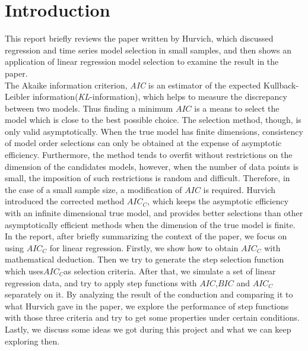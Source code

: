 \section{Introduction}
This report briefly reviews the paper written by Hurvich\cite{hurvich1989regression}, which discussed regression and time series model selection in small samples, and then shows an application of linear regression model selection to examine the result in the paper.\\

The Akaike information criterion, \emph{AIC}\cite{akaike1998information} is an estimator of the expected Kullback-Leibler information(\textit{KL}-information), which helps to measure the discrepancy between two models. Thus finding a minimum  $AIC$ is a means to select the model which is close to the best possible choice.
The selection method, though, is only valid asymptotically. When the true model has finite dimensions, consistency of model order selections can only be obtained at the expense of asymptotic efficiency\cite{hannan1979determination}. Furthermore, the method tends to overfit without restrictions on the dimension of the candidates models, however, when the number of data points is small, the imposition of such restrictions is random and difficult. 
Therefore, in the case of a small sample size, a modification of $AIC$ is required. Hurvich introduced the corrected method $AIC_C$, which keeps the asymptotic efficiency with an infinite dimensional true model, and provides better selections than other asymptotically efficient methods when the dimension of the true model is finite. \\

In the report, after briefly summarizing the context of the paper, we focus on using $AIC_C$ for linear regression. Firstly, we show how to obtain $AIC_C$ with mathematical deduction. Then we try to generate the step selection function which uses$ AIC_C $as selection criteria. After that, we simulate a set of linear regression data, and try to apply step functions with $AIC$,$ BIC$ and $AIC_C$ separately on it.  By analyzing the result of the conduction and comparing it to what Hurvich gave in the paper, we explore the performance of step functions with those three criteria and try to get some properties under certain conditions. Lastly, we discuss some ideas we got during this project and what we can keep exploring then.  
